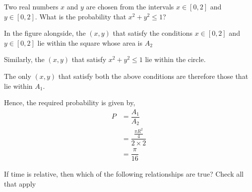\checkboxchar{$\Box$}
\question[5] Two real numbers $x$ and $y$ are chosen from the intervals
$x\in [0,2]$ and $y\in [0,2]$. What is the probability that $x^2+y^2\leq 1$?

\ifprintanswers
  \begin{marginfigure}
  \end{marginfigure} 
\fi 

\begin{solution}[\halfpage]
  In the figure alongside, the $(x,y)$ that satisfy the conditions
  $x\in [0,2]$ and $y\in [0,2]$ lie within the square whose area is $A_2$

  Similarly, the $(x,y)$ that satisfy $x^2+y^2\leq 1$ lie within the circle.

  The only $(x,y)$ that satisfy both the above conditions are therefore
  those that lie within $A_1$.

  Hence, the required probability is given by, 
  \begin{align}
     P &= \dfrac{A_1}{A_2} \\
     &= \dfrac{\frac{\pi R^2}{4}}{2\times 2} \\ 
     &= \dfrac{\pi}{16} 
  \end{align} 
\end{solution}

\question[1] If time is relative, then which of the following 
relationships are true? Check all that apply

\begin{checkboxes}
\end{checkboxes} 

%  
